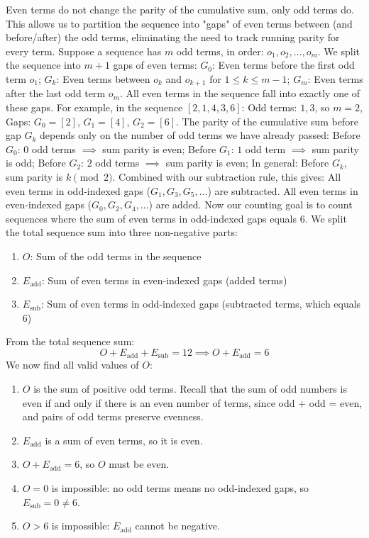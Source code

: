 \begin{enumerate}
Even terms do not change the parity of the cumulative sum, only odd terms do. This allows us to partition the sequence into "gaps" of even terms between (and before/after) the odd terms, eliminating the need to track running parity for every term. Suppose a sequence has $m$ odd terms, in order: $o_1, o_2, \dots, o_m$. We split the sequence into $m+1$ gaps of even terms:
$G_0$: Even terms before the first odd term $o_1$; 
$G_k$: Even terms between $o_k$ and $o_{k+1}$ for $1 \leq k \leq m-1$; 
$G_m$: Even terms after the last odd term $o_m$. All even terms in the sequence fall into exactly one of these gaps.
For example, in the sequence $[2, 1, 4, 3, 6]$: Odd terms: $1, 3$, so $m=2$, Gaps: $G_0 = [2]$, $G_1 = [4]$, $G_2 = [6]$.
The parity of the cumulative sum before gap $G_k$ depends only on the number of odd terms we have already passed: Before $G_0$: $0$ odd terms $\implies$ sum parity is even; Before $G_1$: $1$ odd term $\implies$ sum parity is odd; Before $G_2$: $2$ odd terms $\implies$ sum parity is even; In general: Before $G_k$, sum parity is $k \pmod{2}$.
Combined with our subtraction rule, this gives: All even terms in odd-indexed gaps ($G_1, G_3, G_5, \dots$) are subtracted. All even terms in even-indexed gaps ($G_0, G_2, G_4, \dots$) are added. Now our counting goal is to count sequences where the sum of even terms in odd-indexed gaps equals $6$.
We split the total sequence sum into three non-negative parts:


 
            \begin{enumerate}
        \item $O$: Sum of the odd terms in the sequence
        \item $E_{\text{add}}$: Sum of even terms in even-indexed gaps (added terms)
        \item $E_{\text{sub}}$: Sum of even terms in odd-indexed gaps (subtracted terms, which equals $6$)
            \end{enumerate}
            
From the total sequence sum:
 \[O + E_{\text{add}} + E_{\text{sub}} = 12 \implies O + E_{\text{add}} = 6\]We now find all valid values of $O$:


 
            \begin{enumerate}
        \item $O$ is the sum of positive odd terms. Recall that the sum of odd numbers is even if and only if there is an even number of terms, since odd + odd = even, and pairs of odd terms preserve evenness.
        \item $E_{\text{add}}$ is a sum of even terms, so it is even.
        \item $O + E_{\text{add}} = 6$, so $O$ must be even.
        \item $O = 0$ is impossible: no odd terms means no odd-indexed gaps, so $E_{\text{sub}} = 0 \neq 6$.
        \item $O > 6$ is impossible: $E_{\text{add}}$ cannot be negative.
            \end{enumerate}
            

\end{enumerate}
